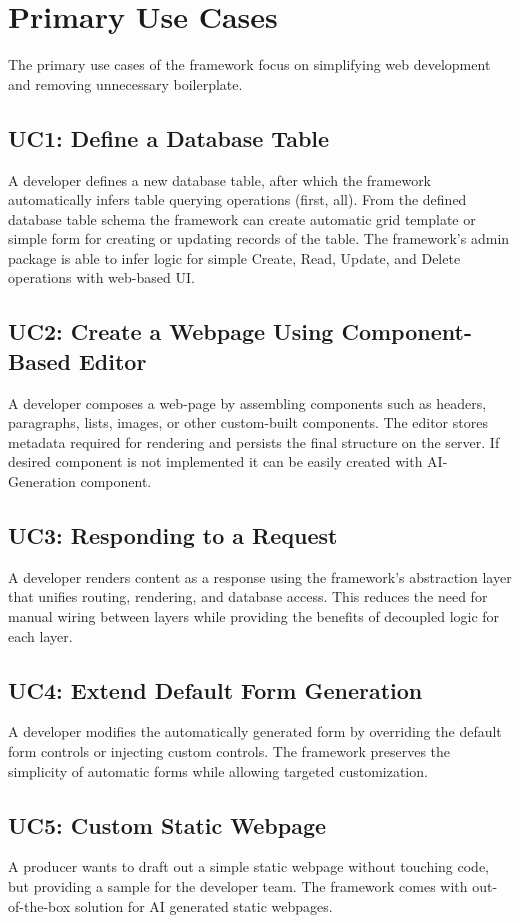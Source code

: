 \section{Primary Use Cases}\label{sec:primary-use-cases}
The primary use cases of the framework focus on simplifying web development and removing unnecessary boilerplate.

\subsection*{UC1: Define a Database Table}
A developer defines a new database table, after which the framework automatically infers table querying operations (first, all).
From the defined database table schema the framework can create automatic grid template or simple form for creating or updating
records of the table.
The framework's admin package is able to infer logic for simple Create, Read, Update, and Delete operations with web-based UI\@.

\subsection*{UC2: Create a Webpage Using Component-Based Editor}
A developer composes a web-page by assembling components such as headers, paragraphs, lists, images,
or other custom-built components.
The editor stores metadata required for rendering and persists the final structure on the server.
If desired component is not implemented it can be easily created with AI-Generation component.

\subsection*{UC3: Responding to a Request}
A developer renders content as a response using the framework's abstraction layer that unifies routing, rendering, and database access.
This reduces the need for manual wiring between layers while providing the benefits of decoupled logic for each layer.

\subsection*{UC4: Extend Default Form Generation}
A developer modifies the automatically generated form by overriding the default form controls or injecting custom controls.
The framework preserves the simplicity of automatic forms while allowing targeted customization.

\subsection*{UC5: Custom Static Webpage}
A producer wants to draft out a simple static webpage without touching code, but providing a sample for the developer
team.
The framework comes with out-of-the-box solution for AI generated static webpages.

